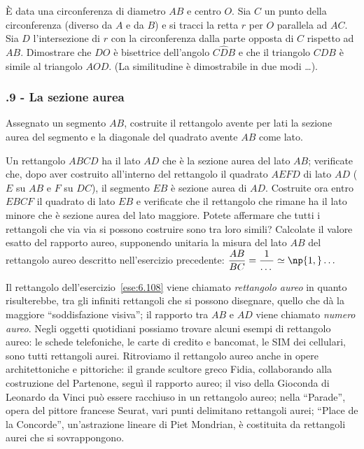 \begin{esercizio}
\label{ese:6.106}
\`E data una circonferenza di diametro $AB$ e centro $O$. Sia $C$ un punto della circonferenza (diverso da $A$ e da $B$) e si tracci la retta $r$ per $O$ parallela ad $AC$. Sia $D$ l'intersezione di $r$ con la circonferenza dalla parte opposta di $C$ rispetto ad $AB$. Dimostrare che $DO$ è bisettrice dell'angolo $C\widehat{D}B$ e che il triangolo $CDB$ è simile al triangolo $AOD$. (La similitudine è dimostrabile in due modi \ldots{}).
\end{esercizio}

\subsubsection*{\thechapter.9 - La sezione aurea}

\begin{esercizio}
\label{ese:6.107}
Assegnato un segmento $AB$, costruite il rettangolo avente per lati la sezione aurea del segmento e la diagonale del quadrato avente $AB$ come lato.
\end{esercizio}

\begin{esercizio}
\label{ese:6.108}
Un rettangolo $ABCD$ ha il lato $AD$ che è la sezione aurea del lato $AB$; verificate che, dopo aver costruito all'interno del rettangolo il quadrato $AEFD$ di lato $AD$ ($E$ su $AB$ e $F$ su $DC$), il segmento $EB$ è sezione aurea di $AD$. Costruite ora entro $EBCF$ il quadrato di lato $EB$ e verificate che il rettangolo che rimane ha il lato minore che è sezione aurea del lato maggiore. Potete affermare che tutti i rettangoli che via via si possono costruire sono tra loro simili? Calcolate il valore esatto del rapporto aureo, supponendo unitaria la misura del lato $AB$ del rettangolo aureo descritto nell'esercizio precedente: $\dfrac{AB}{BC}=\dfrac{1}{\ldots{}}\simeq \np{1,}\ldots{}$
\end{esercizio}

Il rettangolo dell'esercizio~\ref{ese:6.108} viene chiamato \emph{rettangolo aureo} in quanto risulterebbe, tra gli infiniti rettangoli che si possono disegnare, quello che dà la maggiore ``soddisfazione visiva''; il rapporto tra $AB$ e $AD$ viene chiamato \emph{numero aureo}. 
Negli oggetti quotidiani possiamo trovare alcuni esempi di rettangolo aureo: le schede telefoniche, le carte di credito e bancomat, le SIM dei cellulari, sono tutti rettangoli aurei.
Ritroviamo il rettangolo aureo anche in opere architettoniche e pittoriche: il grande scultore greco Fidia, collaborando alla costruzione del Partenone, seguì il rapporto aureo; il viso della Gioconda di Leonardo da Vinci può essere racchiuso in un rettangolo aureo; nella ``Parade'', opera del pittore francese Seurat, vari punti delimitano rettangoli aurei; ``Place de la Concorde'', un'astrazione lineare di Piet Mondrian, è costituita da rettangoli aurei che si sovrappongono.


